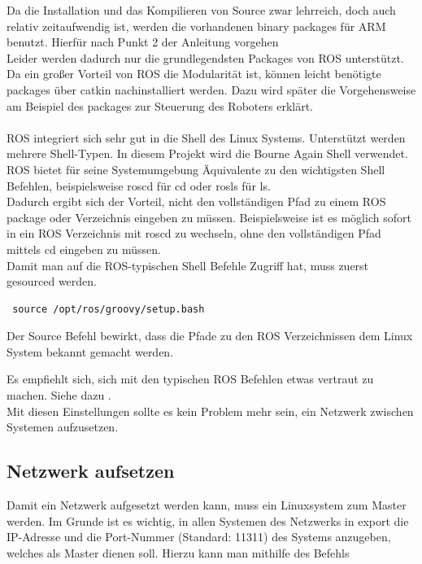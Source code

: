 \documentclass[12pt]{article}
\begin{document}
Da die Installation und das Kompilieren von Source zwar lehrreich, doch auch relativ zeitaufwendig ist, werden die vorhandenen binary packages für ARM benutzt.
Hierfür nach Punkt 2 der Anleitung vorgehen \cite{RosInstall} \\
Leider werden dadurch nur die grundlegendsten Packages von ROS unterstützt.
Da ein großer Vorteil von ROS die Modularität ist, können leicht benötigte packages über catkin nachinstalliert werden.
Dazu wird später die Vorgehensweise am Beispiel des packages zur Steuerung des Roboters erklärt.\\
\\
ROS integriert sich sehr gut in die Shell des Linux Systems.
Unterstützt werden mehrere Shell-Typen. In diesem Projekt wird die Bourne Again Shell verwendet.
ROS bietet für seine Systemumgebung Äquivalente zu den wichtigsten Shell Befehlen, beispielsweise roscd für cd oder rosls für ls. \\
Dadurch ergibt sich der Vorteil, nicht den vollständigen Pfad zu einem ROS package oder Verzeichnis eingeben zu müssen. Beispielsweise ist es möglich sofort in ein ROS Verzeichnis mit roscd zu wechseln, ohne den vollständigen Pfad mittels cd eingeben zu müssen. \\
Damit man auf die ROS-typischen Shell Befehle Zugriff hat, muss zuerst gesourced werden.

 \begin{lstlisting}
 source /opt/ros/groovy/setup.bash
 \end{lstlisting}

Der Source Befehl bewirkt, dass die Pfade zu den ROS Verzeichnissen dem Linux System bekannt gemacht werden.

Es empfiehlt sich, sich mit den typischen ROS Befehlen etwas vertraut zu machen. 
Siehe dazu \cite{RosTuts}. \\
Mit diesen Einstellungen sollte es kein Problem mehr sein, ein Netzwerk zwischen Systemen aufzusetzen.
\subsection{Netzwerk aufsetzen}
Damit ein Netzwerk aufgesetzt werden kann, muss ein Linuxsystem zum Master werden.
Im Grunde ist es wichtig, in allen Systemen des Netzwerks in export die IP-Adresse und die Port-Nummer (Standard: 11311) des Systems anzugeben, welches als Master dienen soll.
Hierzu kann man mithilfe des Befehls 
\end{document}
